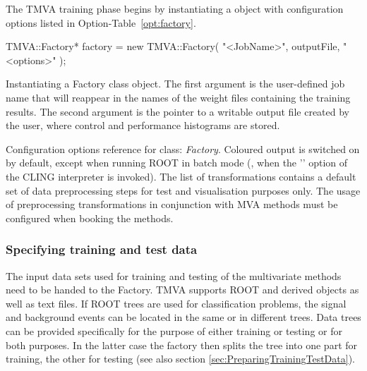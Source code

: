 The TMVA training phase begins by instantiating a  object
with configuration options listed in Option-Table~\ref{opt:factory}.
\begin{codeexample}
\begin{tmvacode}
TMVA::Factory* factory 
           = new TMVA::Factory( "<JobName>", outputFile, "<options>" );
\end{tmvacode}
\caption[.]{\codeexampleCaptionSize Instantiating a Factory class object. The first 
            argument is the user-defined job name that will reappear in the names of 
            the weight files containing the training results. The second argument is the
            pointer to a writable  output file created by the user, where 
            control and performance histograms are stored. }
\end{codeexample}

\begin{option}[t]

\caption[.]{\optionCaptionSize 
     Configuration options reference for class: {\em Factory}.  
     Coloured output is switched on by default, except when running ROOT in batch
     mode (\ie, when the '' option of the CLING interpreter is invoked). 
     The list of transformations contains a default set of data preprocessing steps 
     for test and visualisation purposes only. The usage of preprocessing transformations
     in conjunction with MVA methods must be configured when booking the methods.
}
\label{opt:factory}
\end{option}

\subsubsection{Specifying training and test data}

The input data sets used for training and testing of the multivariate methods
need to be handed to the Factory. TMVA supports ROOT  and derived 
 objects as well as text files. If ROOT trees are used for classification
problems, the signal and background events can be located in the same or in different 
trees. Data trees can be provided specifically for the purpose of either training or testing or for both purposes. In the latter case the factory then splits the tree into one part for training, the other for testing (see also section \ref{sec:PreparingTrainingTestData}).

